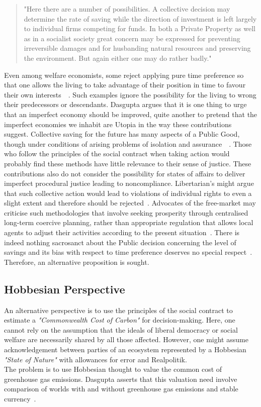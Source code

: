 \documentclass[11pt, oneside]{article}   	%
\begin{document}
\begin{quote}
"Here there are a number of possibilities. A collective decision may determine the rate of saving while the direction of investment is left largely to individual firms competing for funds. In both a Private Property as well as in a socialist society great concern may be expressed for preventing irreversible damages and for husbanding natural resources and preserving the environment. But again either one may do rather badly."~\cite{jr1}
\end{quote}

Even among welfare economists, some reject applying pure time preference so that one allows the living to take advantage of their position in time to favour their own interests~\cite{hs1}~\cite{fr1}.
Such examples ignore the possibility for the living to wrong their predecessors or descendants.
Dasgupta argues that it is one thing to urge that an imperfect economy should be improved, quite another to pretend that the imperfect economies we inhabit are Utopia in the way these contributions suggest.
Collective saving for the future has many aspects of a Public Good, though under conditions of arising problems of isolation and assurance~\cite{as1}~\cite{ms1}.
Those who follow the principles of the social contract when taking action would probably find these methods have little relevance to their sense of justice.
These contributions also do not consider the possibility for states of affairs to deliver imperfect procedural justice leading to noncompliance.
Libertarian's might argue that such collective action would lead to violations of individual rights to even a slight extent and therefore should be rejected~\cite{rn1}.
Advocates of the free-market may criticise such methodologies that involve seeking prosperity through centralised long-term coercive planning, rather than appropriate regulation that allows local agents to adjust their activities according to the present situation~\cite{fh1}.
There is indeed nothing sacrosanct about the Public decision concerning the level of savings and its bias with respect to time preference deserves no special respect~\cite{jr1}.
Therefore, an alternative proposition is sought.\\

\subsection{Hobbesian Perspective}

An alternative perspective is to use the principles of the social contract to estimate a \emph{"Commonwealth Cost of Carbon"} for decision-making.
Here, one cannot rely on the assumption that the ideals of liberal democracy or social welfare are necessarily shared by all those affected.
However, one might assume acknowledgement between parties of an ecosystem represented by a Hobbesian \emph{"State of Nature"} with allowances for error and Realpolitik.\\
The problem is to use Hobbesian thought to value the common cost of greenhouse gas emissions.
Dasgupta asserts that this valuation need involve comparison of worlds with and without greenhouse gas emissions and stable currency~\cite{pd2}.\\
\end{document}

